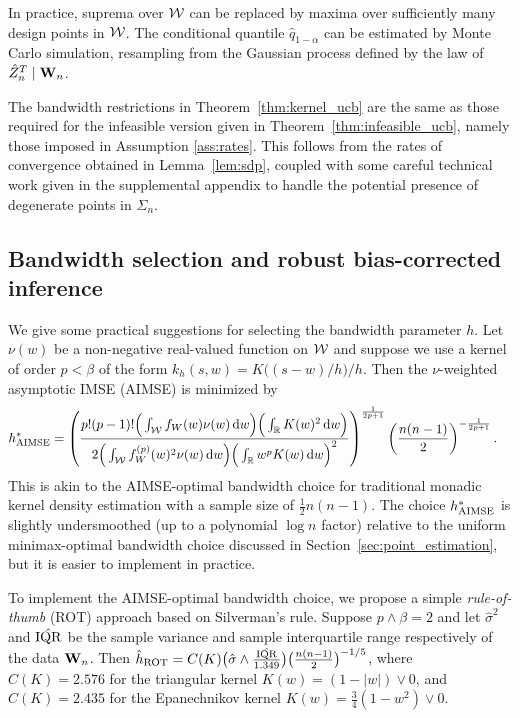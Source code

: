 In practice, suprema over $\mathcal{W}$ can be
replaced by maxima over sufficiently many design points in $\mathcal{W}$.
The conditional quantile $\hat q_{1-\alpha}$
can be estimated by Monte Carlo simulation,
resampling from the Gaussian process defined by the law of
$\hat Z_n^T \mid \mathbf{W}_n$.

The bandwidth restrictions in Theorem~\ref{thm:kernel_ucb} are the same
as those required for the infeasible version
given in Theorem~\ref{thm:infeasible_ucb}, namely those imposed in Assumption
\ref{ass:rates}. This follows from the rates of convergence obtained in
Lemma~\ref{lem:sdp}, coupled with some careful technical work given in the
supplemental appendix to handle the potential presence
of degenerate points in $\Sigma_n$.

\subsection{Bandwidth selection and robust bias-corrected inference}
\label{sec:bandwidth_selection}

We give some practical suggestions for selecting
the bandwidth parameter $h$.
Let $\nu(w)$ be a non-negative real-valued function on $\mathcal{W}$ and
suppose we use a kernel of order $p < \beta$
of the form $k_h(s,w) = K\big((s-w) / h\big)/h$.
Then the $\nu$-weighted asymptotic IMSE (AIMSE) is minimized by
%
\begin{align*}
  h^*_{\operatorname{AIMSE}}
  &=
  \left(
    \frac{
      p!(p-1)!
      \Big(\int_{\mathcal{W}} f_W(w) \nu(w) \,\mathrm{d}w\Big)
      \Big(\int_{\mathbb{R}} K(w)^2 \,\mathrm{d}w\Big)
    }
    {
      2
      \Big(
        \int_{\mathcal{W}}
        f_W^{(p)}(w)^2
        \nu(w)
        \,\mathrm{d}w
      \Big)
      \Big(
        \int_{\mathbb{R}}
        w^p K(w)
        \,\mathrm{d}w
      \Big)^2
    }
  \right)^{\frac{1}{2p+1}}
  \left(
    \frac{n(n-1)}{2}
  \right)^{-\frac{1}{2p+1}}.
\end{align*}
%
This is akin to the AIMSE-optimal bandwidth choice for traditional
monadic kernel density estimation
with a sample size of $\frac{1}{2}n(n-1)$.
The choice $h^*_{\operatorname{AIMSE}}$ is slightly undersmoothed
(up to a polynomial $\log n$ factor)
relative to the uniform minimax-optimal bandwidth choice discussed in
Section~\ref{sec:point_estimation}, but it is easier to implement in practice.

To implement the AIMSE-optimal bandwidth choice,
we propose a simple \emph{rule-of-thumb} (ROT)
approach based on Silverman's rule.
Suppose $p\wedge\beta=2$ and let $\hat\sigma^2$ and $\hat{\operatorname{IQR}}$
be the sample variance and sample interquartile range respectively
of the data $\mathbf{W}_n$. Then
$\hat{h}_{\operatorname{ROT}} = C(K) \big( \hat\sigma \wedge
\frac{\hat{\operatorname{IQR}}}{1.349} \big) \big(\frac{n(n-1)}{2} \big)^{-1/5}$,
where $C(K)=2.576$ for the triangular kernel $K(w) = (1 - |w|) \vee 0$,
and $C(K)=2.435$ for the Epanechnikov kernel
$K(w) = \frac{3}{4}(1 - w^2) \vee 0$.


